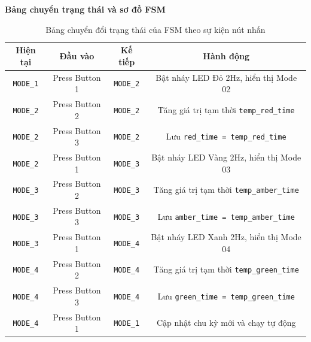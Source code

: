 \textbf{Bảng chuyển trạng thái và sơ đồ FSM}
\begin{table}[htbp]
\centering
\caption{Bảng chuyển đổi trạng thái của FSM theo sự kiện nút nhấn}
\label{tab:fsm_transition}
\begin{tabular}{|c|c|c|c|}
\hline
\textbf{Hiện tại} & \textbf{Đầu vào} & \textbf{Kế tiếp} & \textbf{Hành động} \\ \hline
\texttt{MODE\_1} & Press Button 1 & \texttt{MODE\_2} & Bật nháy LED Đỏ 2Hz, hiển thị Mode 02 \\ \hline
\texttt{MODE\_2} & Press Button 2 & \texttt{MODE\_2} & Tăng giá trị tạm thời \texttt{temp\_red\_time} \\ \hline
\texttt{MODE\_2} & Press Button 3 & \texttt{MODE\_2} & Lưu \texttt{red\_time = temp\_red\_time} \\ \hline
\texttt{MODE\_2} & Press Button 1 & \texttt{MODE\_3} & Bật nháy LED Vàng 2Hz, hiển thị Mode 03 \\ \hline
\texttt{MODE\_3} & Press Button 2 & \texttt{MODE\_3} & Tăng giá trị tạm thời \texttt{temp\_amber\_time} \\ \hline
\texttt{MODE\_3} & Press Button 3 & \texttt{MODE\_3} & Lưu \texttt{amber\_time = temp\_amber\_time} \\ \hline
\texttt{MODE\_3} & Press Button 1 & \texttt{MODE\_4} & Bật nháy LED Xanh 2Hz, hiển thị Mode 04 \\ \hline
\texttt{MODE\_4} & Press Button 2 & \texttt{MODE\_4} & Tăng giá trị tạm thời \texttt{temp\_green\_time} \\ \hline
\texttt{MODE\_4} & Press Button 3 & \texttt{MODE\_4} & Lưu \texttt{green\_time = temp\_green\_time} \\ \hline
\texttt{MODE\_4} & Press Button 1 & \texttt{MODE\_1} & Cập nhật chu kỳ mới và chạy tự động \\ \hline
\end{tabular}
\end{table}

